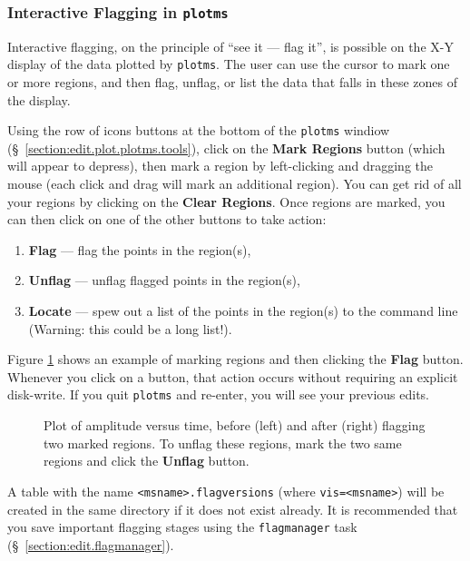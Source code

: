 
\subsubsection{Interactive Flagging in {\tt plotms}}
\label{section:edit.plot.plotms.flag}

Interactive flagging, on the principle of ``see it --- flag it'', is possible on the X-Y display of the data plotted by {\tt plotms}.  The user can
use the cursor to mark one or more regions, and then flag, unflag, or list the data that falls in these zones of the display.

Using the row of icons buttons at the bottom of the {\tt plotms} windiow (\S~\ref{section:edit.plot.plotms.tools}), click on the {\bf Mark Regions} button (which will appear to depress), then mark a region by left-clicking and dragging the mouse (each click and drag will mark an additional region).  You can get rid of all your regions by clicking on the {\bf Clear Regions}. Once regions are marked, you can then click on one of the other buttons to take action:
\begin{enumerate}
\item {\bf Flag} --- flag the points in the region(s),
\item {\bf Unflag} --- unflag flagged points in the region(s),
\item {\bf Locate} --- spew out a list of the points in the region(s) to the command line (Warning: this could be a long list!).
\end{enumerate}
Figure \ref{fig:markflags} shows an example of marking regions and then clicking the {\bf Flag} button. Whenever you click on a button, that action occurs without requiring an explicit disk-write.  If you quit {\tt plotms} and re-enter, you will see your previous edits.

\begin{figure}[h!]
\begin{center}
\caption{\label{fig:markflags} Plot of amplitude versus time, before (left) and after (right) flagging two marked regions. To unflag these regions, mark the two same regions and click the {\bf Unflag} button.}
\hrulefill
\end{center}
\end{figure}

A table with the name {\tt <msname>.flagversions} (where {\tt vis=<msname>}) will be created in the same directory if it does not exist already. It is recommended that you save important flagging stages using the {\tt flagmanager} task (\S~\ref{section:edit.flagmanager}).

